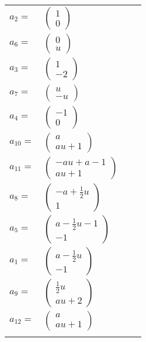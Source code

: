 \documentclass[1p]{elsarticle_modified}
\theoremstyle{definition}
\begin{document}
\begin{tabular}{m{7pt} m{180pt} m{7pt} m{180pt} }
\flushright $a_{2}=$&$\begin{pmatrix}1\\0\end{pmatrix}$ \\
\flushright $a_{6}=$&$\begin{pmatrix}0\\u\end{pmatrix}$ \\
\flushright $a_{3}=$&$\begin{pmatrix}1\\-2\end{pmatrix}$ \\
\flushright $a_{7}=$&$\begin{pmatrix}u\\- u\end{pmatrix}$ \\
\flushright $a_{4}=$&$\begin{pmatrix}-1\\0\end{pmatrix}$ \\
\flushright $a_{10}=$&$\begin{pmatrix}a\\a u+1\end{pmatrix}$ \\
\flushright $a_{11}=$&$\begin{pmatrix}- a u+a-1\\a u+1\end{pmatrix}$ \\
\flushright $a_{8}=$&$\begin{pmatrix}- a+\frac{1}{2} u\\1\end{pmatrix}$ \\
\flushright $a_{5}=$&$\begin{pmatrix}a-\frac{1}{2} u-1\\-1\end{pmatrix}$ \\
\flushright $a_{1}=$&$\begin{pmatrix}a-\frac{1}{2} u\\-1\end{pmatrix}$ \\
\flushright $a_{9}=$&$\begin{pmatrix}\frac{1}{2} u\\a u+2\end{pmatrix}$ \\
\flushright $a_{12}=$&$\begin{pmatrix}a\\a u+1\end{pmatrix}$\\&\end{tabular}
\end{document}
